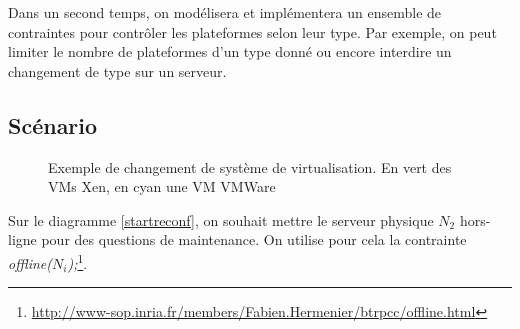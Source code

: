 \documentclass[a4paper]{article}
\begin{document}
Dans un second temps, on modélisera et implémentera un ensemble de contraintes
pour contrôler les plateformes selon leur type. Par exemple, on peut limiter le
nombre de plateformes d'un type donné ou encore interdire un changement de type
sur un serveur.

\subsection{Scénario}
\begin{figure}[!ht]
	\centering
	\caption{\label{reconf} Exemple de changement de système de
		virtualisation. En vert des VMs Xen, en cyan une VM VMWare}
\end{figure}

Sur le diagramme \ref{startreconf}, on souhait mettre le serveur physique
$N_2$ hors-ligne pour des questions de maintenance. On utilise pour cela
la contrainte \textit{offline($N_i$);}\footnote{\url{http://www-sop.inria.fr/members/Fabien.Hermenier/btrpcc/offline.html}}.
\end{document}
